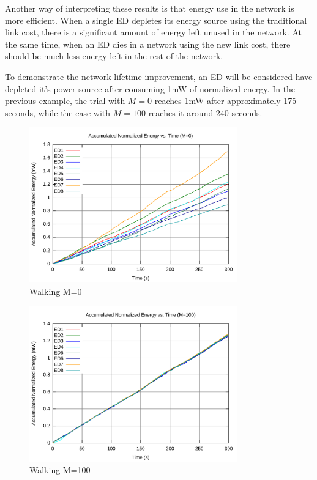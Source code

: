 \documentclass{article}
\begin{document}
Another way of interpreting these results is that energy use in the network is more efficient. When a single ED depletes its energy source using the traditional link cost, there is a significant amount of energy left unused in the network. At the same time, when an ED dies in a network using the new link cost, there should be much less energy left in the rest of the network.

To demonstrate the network lifetime improvement, an ED will be considered have depleted it's power source after consuming 1mW of normalized energy. In the previous example, the trial with $M=0$ reaches 1mW after approximately 175 seconds, while the case with $M=100$ reaches it around 240 seconds.

\begin{figure}[!htb]
\includegraphics[width=0.8\textwidth]{figures/walk2-c0.pdf}
\caption{Walking M=0}
\label{fig:walk2-c0}
\end{figure}

\begin{figure}[!htb]
\includegraphics[width=0.8\textwidth]{figures/walk2-c100.pdf}
\caption{Walking M=100}
\label{fig:walk2-c100}
\end{figure}
\end{document}
